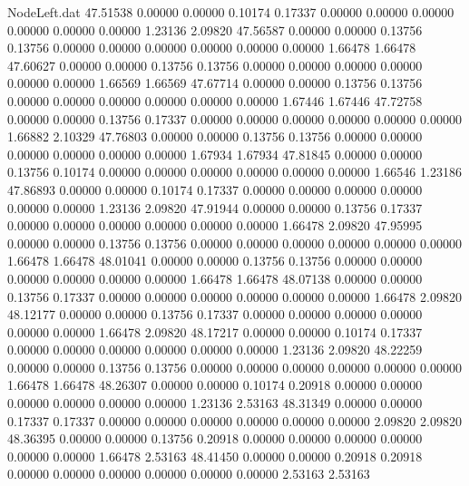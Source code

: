 \begin{filecontents}{NodeLeft.dat}
  47.51538    0.00000    0.00000     0.10174    0.17337    0.00000    0.00000    0.00000    0.00000    0.00000    0.00000    1.23136    2.09820
  47.56587    0.00000    0.00000     0.13756    0.13756    0.00000    0.00000    0.00000    0.00000    0.00000    0.00000    1.66478    1.66478
  47.60627    0.00000    0.00000     0.13756    0.13756    0.00000    0.00000    0.00000    0.00000    0.00000    0.00000    1.66569    1.66569
  47.67714    0.00000    0.00000     0.13756    0.13756    0.00000    0.00000    0.00000    0.00000    0.00000    0.00000    1.67446    1.67446
  47.72758    0.00000    0.00000     0.13756    0.17337    0.00000    0.00000    0.00000    0.00000    0.00000    0.00000    1.66882    2.10329
  47.76803    0.00000    0.00000     0.13756    0.13756    0.00000    0.00000    0.00000    0.00000    0.00000    0.00000    1.67934    1.67934
  47.81845    0.00000    0.00000     0.13756    0.10174    0.00000    0.00000    0.00000    0.00000    0.00000    0.00000    1.66546    1.23186
  47.86893    0.00000    0.00000     0.10174    0.17337    0.00000    0.00000    0.00000    0.00000    0.00000    0.00000    1.23136    2.09820
  47.91944    0.00000    0.00000     0.13756    0.17337    0.00000    0.00000    0.00000    0.00000    0.00000    0.00000    1.66478    2.09820
  47.95995    0.00000    0.00000     0.13756    0.13756    0.00000    0.00000    0.00000    0.00000    0.00000    0.00000    1.66478    1.66478
  48.01041    0.00000    0.00000     0.13756    0.13756    0.00000    0.00000    0.00000    0.00000    0.00000    0.00000    1.66478    1.66478
  48.07138    0.00000    0.00000     0.13756    0.17337    0.00000    0.00000    0.00000    0.00000    0.00000    0.00000    1.66478    2.09820
  48.12177    0.00000    0.00000     0.13756    0.17337    0.00000    0.00000    0.00000    0.00000    0.00000    0.00000    1.66478    2.09820
  48.17217    0.00000    0.00000     0.10174    0.17337    0.00000    0.00000    0.00000    0.00000    0.00000    0.00000    1.23136    2.09820
  48.22259    0.00000    0.00000     0.13756    0.13756    0.00000    0.00000    0.00000    0.00000    0.00000    0.00000    1.66478    1.66478
  48.26307    0.00000    0.00000     0.10174    0.20918    0.00000    0.00000    0.00000    0.00000    0.00000    0.00000    1.23136    2.53163
  48.31349    0.00000    0.00000     0.17337    0.17337    0.00000    0.00000    0.00000    0.00000    0.00000    0.00000    2.09820    2.09820
  48.36395    0.00000    0.00000     0.13756    0.20918    0.00000    0.00000    0.00000    0.00000    0.00000    0.00000    1.66478    2.53163
  48.41450    0.00000    0.00000     0.20918    0.20918    0.00000    0.00000    0.00000    0.00000    0.00000    0.00000    2.53163    2.53163

\end{filecontents}
